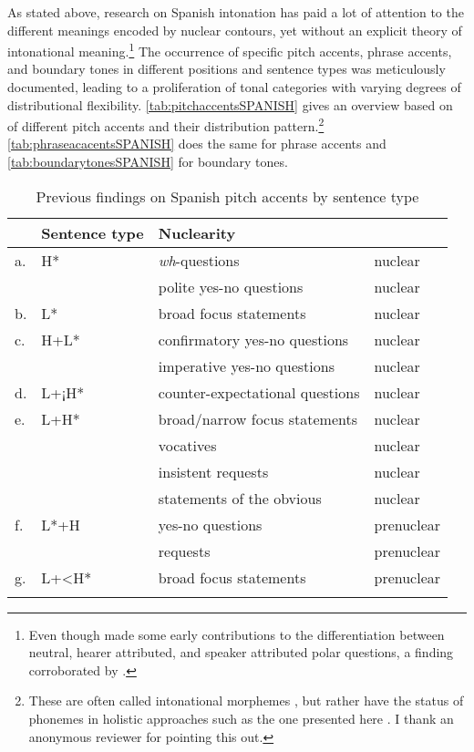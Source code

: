 As stated above, research on Spanish intonation has paid a lot of attention to the different meanings encoded by nuclear contours, yet without an explicit theory of intonational meaning.\footnote{Even though \citet{EscandellVidal.1998} made some early contributions to the differentiation between neutral, hearer attributed, and speaker attributed polar questions, a finding corroborated by \citet{HenriksenArmstrongGarciaAmaya.2016}.} The occurrence of specific pitch accents, phrase accents, and boundary tones in different positions and sentence types was meti\-cu\-lously do\-cu\-men\-ted, leading to a proliferation of tonal categories with varying degrees of distributional flexibility. \autoref{tab:pitchaccentsSPANISH} gives an overview based on \citet{Aguilar.2009} of different pitch accents and their distribution pattern.\footnote{These are often called intonational morphemes \citep{Gussenhoven.2016}, but rather have the status of phonemes in holistic approaches such as the one presented here \citep[219--223]{Buring.2016}. I thank an anonymous reviewer for pointing this out.} \autoref{tab:phraseacacentsSPANISH} does the same for phrase accents and \autoref{tab:boundarytonesSPANISH} for boundary tones.

\begin{table}
	\begin{tabular}{l@{~~}lll}
		\lsptoprule
		\multicolumn{2}{l}{Pitch accent}   &  Sentence type & Nuclearity \\
		\midrule
		a. & H* & \textit{wh}-questions & nuclear\\
		   & & polite yes-no questions & nuclear\\
		b. & L* & broad focus statements & nuclear\\
		c. & H+L* & confirmatory yes-no questions & nuclear\\
		   & & imperative yes-no questions & nuclear \\
		d. & L+¡H* & counter-expectational questions & nuclear\\
		e. & L+H* & broad/narrow focus statements & nuclear \\
		   & & vocatives & nuclear\\
		   & & insistent requests & nuclear\\
		   & & statements of the obvious & nuclear\\	
		f. & L*+H & yes-no questions & prenuclear \\
		   & & requests & prenuclear\\
		g. & L+<H* & broad focus statements & prenuclear \\
		\lspbottomrule 
	\end{tabular}
	\caption{Previous findings on Spanish pitch accents 
	by sentence type \citep{Aguilar.2009}}
	\label{tab:pitchaccentsSPANISH}
\end{table}

